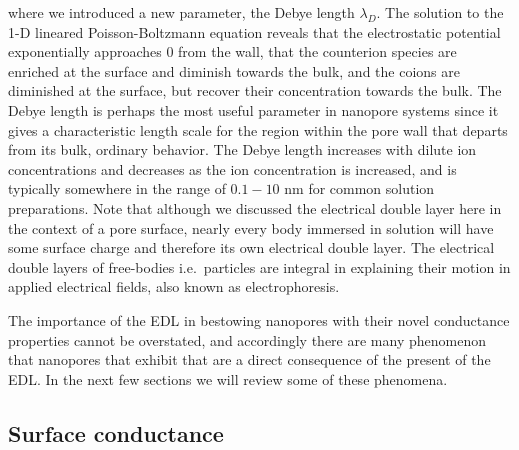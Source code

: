 			where we introduced a new parameter, the Debye length $\lambda_{D}$. The solution to the 1-D lineared Poisson-Boltzmann equation reveals that the electrostatic potential exponentially approaches 0 from the wall, that the counterion species are enriched at the surface and diminish towards the bulk, and the coions are diminished at the surface, but recover their concentration towards the bulk. The Debye length is perhaps the most useful parameter in nanopore systems since it gives a characteristic length scale for the region within the pore wall that departs from its bulk, ordinary behavior. The Debye length increases with dilute ion concentrations and decreases as the ion concentration is increased, and is typically somewhere in the range of $0.1-10$ nm for common solution preparations. Note that although we discussed the electrical double layer here in the context of a pore surface, nearly every body immersed in solution will have some surface charge and therefore its own electrical double layer. The electrical double layers of free-bodies i.e.~particles are integral in explaining their motion in applied electrical fields, also known as electrophoresis. 
			
			The importance of the EDL in bestowing nanopores with their novel conductance properties cannot be overstated, and accordingly there are many phenomenon that nanopores that exhibit that are a direct consequence of the present of the EDL. In the next few sections we will review some of these phenomena.
			
			
		\subsection{Surface conductance}
		

